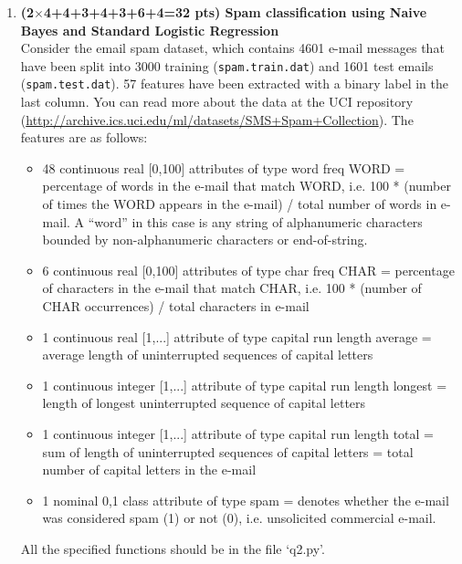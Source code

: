 \documentclass[a4paper,12pt]{article}
\begin{document}
\begin{enumerate}
    \vspace{1em}
    \item \textbf{(2$\times$4+4+3+4+3+6+4=32 pts) Spam classification using Naive Bayes and Standard Logistic Regression} \\
    Consider the email spam dataset, which contains 4601 e-mail messages that have been split into 3000 training (\texttt{spam.train.dat}) and 1601 test emails (\texttt{spam.test.dat}). 57 features have been extracted with a binary label in the last column. You can read more about the data at the UCI repository (\url{http://archive.ics.uci.edu/ml/datasets/SMS+Spam+Collection}). The features are as follows:
    \begin{itemize}
        \item 48 continuous real [0,100] attributes of type word freq WORD = percentage of words in the e-mail that match WORD, i.e. 100 * (number of times the WORD appears in the e-mail) / total number of words in e-mail. A ``word'' in this case is any string of alphanumeric characters bounded by non-alphanumeric characters or end-of-string.
        \item 6 continuous real [0,100] attributes of type char freq CHAR = percentage of characters in the e-mail that match CHAR, i.e. 100 * (number of CHAR occurrences) / total characters in e-mail
        \item 1 continuous real [1,...] attribute of type capital run length average = average length of uninterrupted sequences of capital letters
        \item 1 continuous integer [1,...] attribute of type capital run length longest = length of longest uninterrupted sequence of capital letters
        \item 1 continuous integer [1,...] attribute of type capital run length total = sum of length of uninterrupted sequences of capital letters = total number of capital letters in the e-mail
        \item 1 nominal 0,1 class attribute of type spam = denotes whether the e-mail was considered spam (1) or not (0), i.e. unsolicited commercial e-mail.
    \end{itemize}
    All the specified functions should be in the file `q2.py'.
    

\end{enumerate}
\end{document}
